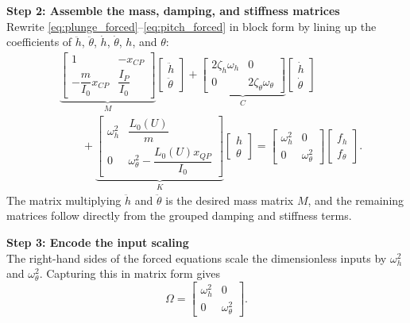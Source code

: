 \documentclass[12pt]{article}
\begin{document}
\begin{stepbox}
\textbf{Step 2: Assemble the mass, damping, and stiffness matrices}\\[0.5em]
Rewrite \eqref{eq:plunge_forced}--\eqref{eq:pitch_forced} in block form by lining up the coefficients of $\ddot{h}$, $\ddot{\theta}$, $\dot{h}$, $\dot{\theta}$, $h$, and $\theta$:
\[
\begin{aligned}
&\underbrace{\begin{bmatrix} 1 & -x_{CP} \\[0.3em] -\dfrac{m}{I_0}x_{CP} & \dfrac{I_P}{I_0} \end{bmatrix}}_{M}
\begin{bmatrix} \ddot{h} \\[0.3em] \ddot{\theta} \end{bmatrix}
 + \underbrace{\begin{bmatrix} 2\zeta_h\omega_h & 0 \\[0.3em] 0 & 2\zeta_\theta\omega_\theta \end{bmatrix}}_{C}
\begin{bmatrix} \dot{h} \\[0.3em] \dot{\theta} \end{bmatrix} \\
&\qquad + \underbrace{\begin{bmatrix} \omega_h^2 & \dfrac{L_0(U)}{m} \\[0.3em] 0 & \omega_\theta^2 - \dfrac{L_0(U)x_{QP}}{I_0} \end{bmatrix}}_{K}
\begin{bmatrix} h \\[0.3em] \theta \end{bmatrix}
=
\begin{bmatrix} \omega_h^2 & 0 \\[0.3em] 0 & \omega_\theta^2 \end{bmatrix}
\begin{bmatrix} f_h \\[0.3em] f_\theta \end{bmatrix}.
\end{aligned}
\]
The matrix multiplying $\ddot{h}$ and $\ddot{\theta}$ is the desired mass matrix $M$, and the remaining matrices follow directly from the grouped damping and stiffness terms.
\end{stepbox}

\begin{stepbox}
\textbf{Step 3: Encode the input scaling}\\[0.5em]
The right-hand sides of the forced equations scale the dimensionless inputs by $\omega_h^2$ and $\omega_\theta^2$.  Capturing this in matrix form gives
\[
\Omega = \begin{bmatrix}
\omega_h^2 & 0 \\
0 & \omega_\theta^2
\end{bmatrix}.
\]
\end{stepbox}
\end{document}
